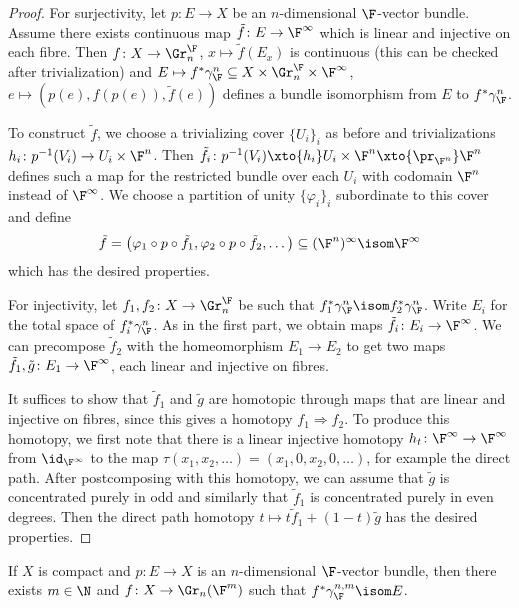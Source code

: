 \begin{proof}
	For surjectivity, let $p\colon E \to X$ be an $n$-dimensional $\F$-vector bundle.
	Assume there exists continuous map $\tilde{f}\colon E \to \F^\infty$ which is linear and injective on each fibre.
	Then $f\colon X \to \Gr_n^{\F}$, $x \mapsto \tilde{f}(E_x)$ is continuous (this can be checked after trivialization) and $E \mapsto f^* \gamma_{\F}^n \subseteq X \times \Gr_n^{\F} \times \F^\infty$, $e \mapsto (p(e), f(p(e)), \tilde{f}(e))$ defines a bundle isomorphism from $E$ to $f^* \gamma_{\F}^n$.

	To construct $\tilde{f}$, we choose a trivializing cover $\{U_i\}_i$ as before and trivializations $h_i\colon p^{-1}(V_i) \to U_i \times \F^n$.
	Then $\tilde{f}_i\colon p^{-1}(V_i) \xto{h_i} U_i \times \F^n \xto{\pr_{\F^n}} \F^n$ defines such a map for the restricted bundle over each $U_i$ with codomain $\F^n$ instead of $\F^\infty$.
	We choose a partition of unity $\{\varphi_i\}_i$ subordinate to this cover and define
	\begin{equation*}
		\tilde{f} = \big(\varphi_1 \circ p \circ \tilde{f}_1, \varphi_2 \circ p \circ \tilde{f}_2, \ldots\big) \subseteq (\F^n)^\infty \isom \F^\infty
	\end{equation*}
	which has the desired properties.

	For injectivity, let $f_1, f_2\colon X \to \Gr^{\F}_n$ be such that $f_1^* \gamma_{\F}^n \isom f_2^* \gamma_{\F}^n$.
	Write $E_i$ for the total space of $f_i^* \gamma_{\F}^n$.
	As in the first part, we obtain maps $\tilde{f}_i\colon E_i \to \F^\infty$.
	We can precompose $\tilde{f}_2$ with the homeomorphism $E_1 \to E_2$ to get two maps $\tilde{f}_1, \tilde{g}\colon E_1 \to \F^\infty$, each linear and injective on fibres.

	It suffices to show that $\tilde{f}_1$ and $\tilde{g}$ are homotopic through maps that are linear and injective on fibres, since this gives a homotopy $f_1 \Rightarrow f_2$.
	To produce this homotopy, we first note that there is a linear injective homotopy $h_t\colon \F^\infty \to \F^\infty$ from $\id_{\F^\infty}$ to the map $\tau(x_1, x_2, \ldots) = (x_1, 0, x_2, 0, \ldots)$, for example the direct path.
	After postcomposing with this homotopy, we can assume that $\tilde{g}$ is concentrated purely in odd and similarly that $\tilde{f}_1$ is concentrated purely in even degrees.
	Then the direct path homotopy $t \mapsto t \tilde{f}_1 + (1 - t) \tilde{g}$ has the desired properties.
\end{proof}
\begin{corollary}
	If $X$ is compact and $p\colon E \to X$ is an $n$-dimensional $\F$-vector bundle, then there exists $m \in \N$ and $f\colon X \to \Gr_n(\F^m)$ such that $f^* \gamma_{\F}^{n, m} \isom E$. 
\end{corollary}
